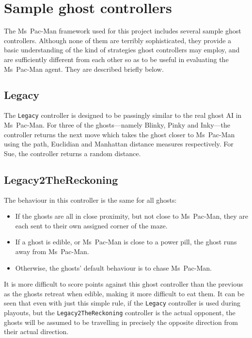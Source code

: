 \section{Sample ghost controllers}

The Ms~Pac-Man framework used for this project includes several sample ghost controllers.  Although none of them are terribly sophisticated, they provide a basic understanding of the kind of strategies ghost controllers may employ, and are sufficiently different from each other so as to be useful in evaluating the Ms~Pac-Man agent.  They are described briefly below.

\subsection{Legacy}

The {\tt Legacy} controller is designed to be passingly similar to the real ghost AI in Ms~Pac-Man.  For three of the ghosts---namely Blinky, Pinky and Inky---the controller returns the next move which takes the ghost closer to Ms~Pac-Man using the path, Euclidian and Manhattan distance measures respectively.  For Sue, the controller returns a random distance.

\subsection{Legacy2TheReckoning}

The behaviour in this controller is the same for all ghosts:

\begin{itemize}
\item If the ghosts are all in close proximity, but not close to Ms~Pac-Man, they are each sent to their own assigned corner of the maze.
\item If a ghost is edible, or Ms~Pac-Man is close to a power pill, the ghost runs away from Ms~Pac-Man.
\item Otherwise, the ghosts' default behaviour is to chase Ms~Pac-Man.
\end{itemize}

It is more difficult to score points against this ghost controller than the previous as the ghosts retreat when edible, making it more difficult to eat them.  It can be seen that even with just this simple rule, if the {\tt Legacy} controller is used during playouts, but the {\tt Legacy2TheReckoning} controller is the actual opponent, the ghosts will be assumed to be travelling in precisely the opposite direction from their actual direction.

